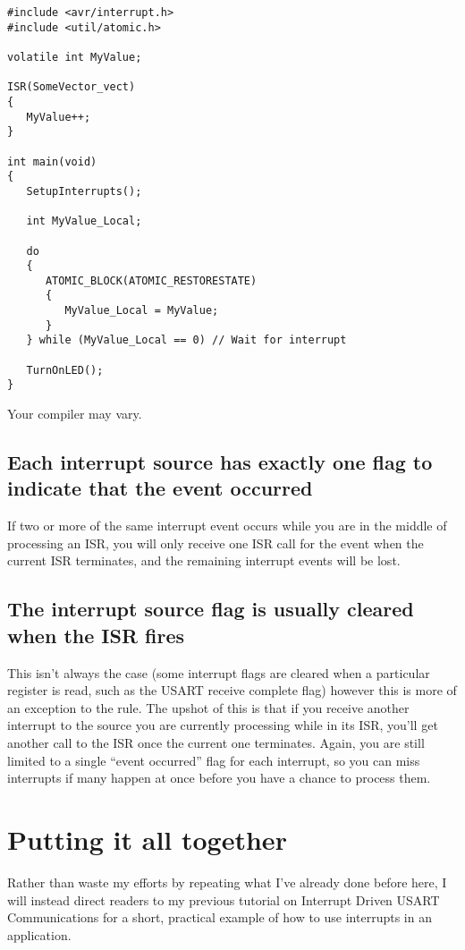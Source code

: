 \documentclass[a4paper,oneside,notitlepage]{book}
\begin{document}
\begin{center}
\begin{lstlisting}
#include <avr/interrupt.h>
#include <util/atomic.h>

volatile int MyValue;

ISR(SomeVector_vect)
{
   MyValue++;
}

int main(void)
{
   SetupInterrupts();

   int MyValue_Local;

   do
   {
      ATOMIC_BLOCK(ATOMIC_RESTORESTATE)
      {
         MyValue_Local = MyValue;
      }
   } while (MyValue_Local == 0) // Wait for interrupt

   TurnOnLED();
}
\end{lstlisting}
\end{center}

Your compiler may vary.

\section{Each interrupt source has exactly one flag to indicate that the event occurred}
If two or more of the same interrupt event occurs while you are in the middle of processing an ISR, you will only receive one ISR call for the event when the current ISR terminates, and the remaining interrupt events will be lost.

\section{The interrupt source flag is usually cleared when the ISR fires}
This isn't always the case (some interrupt flags are cleared when a particular register is read, such as the USART receive complete flag) however this is more of an exception to the rule. The upshot of this is that if you receive another interrupt to the source you are currently processing while in its ISR, you'll get another call to the ISR once the current one terminates. Again, you are still limited to a single ``event occurred'' flag for each interrupt, so you can miss interrupts if many happen at once before you have a chance to process them.


\label{chp:FinalWords}
\chapter{Putting it all together}

Rather than waste my efforts by repeating what I've already done before here, I will instead direct readers to my previous tutorial on Interrupt Driven USART Communications for a short, practical example of how to use interrupts in an application. 
\end{document}
